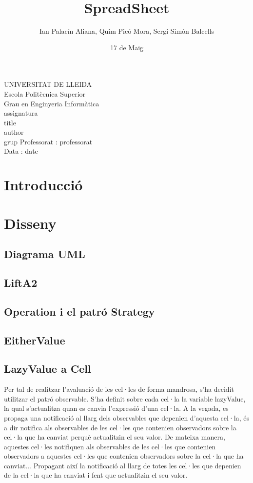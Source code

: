 \documentclass{article}
\title{SpreadSheet}
\author{Ian Palacín Aliana, Quim Picó Mora, Sergi Simón Balcells}
\date{17 de Maig}
\renewcommand{\maketitle}{ %
	\begin{titlepage}
		\raggedright{UNIVERSITAT DE LLEIDA \\
			Escola Politècnica Superior \\
			Grau en Enginyeria Informàtica\\
			\1assignatura\\}
		\vspace{5cm}
		\centering\huge{\5title \\}
		\vspace{3cm}
		\large{\6author} \\
		\normalsize{\3grup}
		\vfill
		Professorat : \4professorat \\
		Data : \7date
\end{titlepage}}
\begin{document}
	\maketitle
	\newpage
	\section{Introducció}%
	\section{Disseny}
	\subsection{Diagrama UML}%
	\subsection{LiftA2}%
	\subsection{Operation i el patró Strategy}%
	\subsection{EitherValue}%
	\subsection{LazyValue a Cell}%
Per tal de realitzar l'avaluació de les cel·les de forma mandrosa, s'ha decidit utilitzar el patró observable. S'ha definit sobre cada cel·la la variable lazyValue, la qual s'actualitza quan es canvia l'expressió d'una cel·la. A la vegada, es propaga una notificació al llarg dels observables que depenien d'aquesta cel·la, és a dir notifica als observables de les cel·les que contenien observadors sobre la cel·la que ha canviat perquè actualitzin el seu valor. De mateixa manera, aquestes cel·les notifiquen als observables de les cel·les que contenien observadors a aquestes cel·les que contenien observadors sobre la cel·la que ha canviat... Propagant així la notificació al llarg de totes les cel·les que depenien de la cel·la que ha canviat i fent que actualitzin el seu valor.
\end{document}
